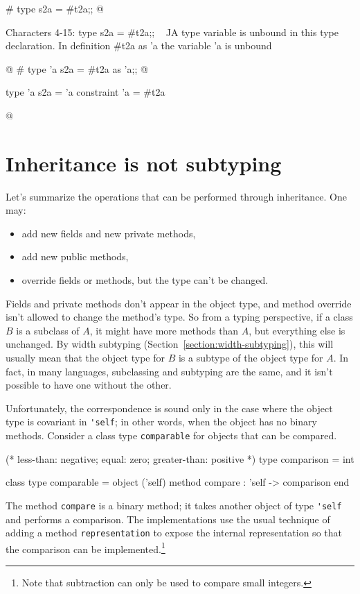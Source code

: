 \begin{ocaml}
# type s2a = #t2a;;
@
\begin{toperror}
Characters 4-15:
  type s2a = #t2a;;
      ^^^^^^^^^^^
A type variable is unbound in this type declaration.
In definition #t2a as 'a the variable 'a is unbound
\end{toperror}
@
# type 'a s2a = #t2a as 'a;;
@
\begin{topoutput}
type 'a s2a = 'a constraint 'a = #t2a
\end{topoutput}
@
\end{ocaml}

\section{Inheritance is not subtyping}

Let's summarize the operations that can be performed through inheritance.
One may:
%
\begin{itemize}
\item add new fields and new private methods,
\item add new public methods,
\item override fields or methods, but the type can't be changed.
\end{itemize}
%
Fields and private methods don't appear in the object type, and method override isn't allowed to
change the method's type.  So from a typing perspective, if a class $B$ is a subclass of $A$, it
might have more methods than $A$, but everything else is unchanged.  By width subtyping
(Section~\ref{section:width-subtyping}), this will usually mean that the object type for $B$ is a
subtype of the object type for $A$.  In fact, in many languages, subclassing and subtyping are the
same, and it isn't possible to have one without the other.

Unfortunately, the correspondence is sound only in the case where the object type is covariant
in \hbox{\lstinline/'self/}; in other words, when the object has no binary methods.  Consider a class
type \hbox{\lstinline/comparable/} for objects that can be compared.
\label{page:comparable}

\begin{ocaml}
(* less-than: negative; equal: zero; greater-than: positive *)
type comparison = int

class type comparable =
object ('self)
   method compare : 'self -> comparison
end
\end{ocaml}
%
The method \hbox{\lstinline/compare/} is a binary method; it takes another object of type \hbox{\lstinline/'self/}
and performs a comparison.  The implementations use the usual technique of adding a
method \hbox{\lstinline/representation/} to expose the internal representation so that the comparison can
be implemented.\footnote{Note that subtraction can only be used to compare small
integers.}

